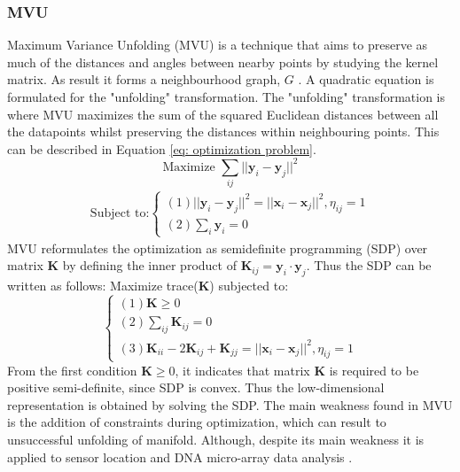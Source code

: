 \documentclass[11pt,twocolumn]{witseiepaper}
\begin{document}
	\subsubsection{MVU}
	Maximum Variance Unfolding (MVU) is a technique that aims to preserve as much of the distances and angles between nearby points by studying the kernel matrix. As result it forms a neighbourhood graph, $G$ \cite{Jiang2011}. A quadratic equation is formulated for the "unfolding" transformation. The "unfolding" transformation is where MVU maximizes the sum of the squared Euclidean distances between all the datapoints whilst preserving the distances within neighbouring points. This can be described in Equation \ref{eq: optimization problem}.
	\begin{equation}
		\text{Maximize } \sum_{ij}||\textbf{y}_i - \textbf{y}_j||^{2}
		\label{eq: optimization problem}
	\end{equation}
	\begin{align*}
		\text{Subject to:}
		\begin{cases}
			(1)||\textbf{y}_i - \textbf{y}_j||^{2} = ||\textbf{x}_i - \textbf{x}_j||^{2} , \eta_{ij} = 1 \\
			(2)\sum_{i}\textbf{y}_i = 0
		\end{cases}
	\end{align*}
	MVU reformulates the optimization as semidefinite programming (SDP) over matrix $\textbf{K}$ by defining the inner product of $\textbf{K}_{ij} = \textbf{y}_i \cdot \textbf{y}_j$. Thus the SDP can be written as follows: 
	\newline
	Maximize trace(\textbf{K}) subjected to:
	\begin{equation}
		\begin{cases}
			(1) \textbf{K} \geq 0 \\
			(2) \sum_{ij} \textbf{K}_{ij} = 0 \\
			(3) \textbf{K}_{ii} - 2\textbf{K}_{ij} + \textbf{K}_{jj} = ||\textbf{x}_i - \textbf{x}_j||^{2}, \eta_{ij} = 1
		\end{cases}
	\end{equation} 
	From the first condition $\textbf{K} \geq 0$, it indicates that matrix $\textbf{K}$ is required to be positive semi-definite, since SDP is convex. Thus the low-dimensional representation is obtained by solving the SDP. The main weakness found in MVU is the addition of constraints during optimization, which can result to unsuccessful unfolding of manifold. Although, despite its main weakness it is applied to sensor location and DNA micro-array data analysis \cite{van2009dimensionality}.
	
\end{document}
